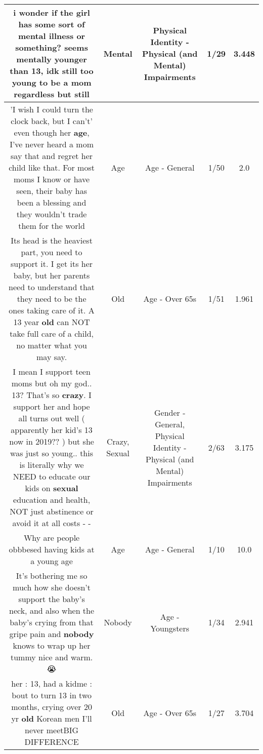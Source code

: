 \documentclass[11pt]{article}
\newlength\mylength
\begin{document}
\begin{center}
\begin{longtable}{|C{.65\mylength}|C{.30\mylength}|C{.12\mylength}|C{.12\mylength}|C{.12\mylength}|}
  \small i wonder if the girl has some sort of \textbf{mental} illness or something? seems mentally younger than 13, idk still too young to be a mom regardless but still\normalsize   & Mental & Physical Identity - Physical (and Mental) Impairments & 1/29 & 3.448 \\  \hline
  \small 'I wish I could turn the clock back, but I can't' even though her \textbf{age}, I've never heard a mom say that and regret her child like that. For most moms I know or have seen, their baby has been a blessing and they wouldn't trade them for the world\normalsize   & Age & Age - General & 1/50 & 2.0 \\  \hline
  \small Its head is the heaviest part, you need to support it. I get its her baby, but her parents need to understand that they need to be the ones taking care of it. A 13 year \textbf{old} can NOT take full care of a child, no matter what you may say.\normalsize   & Old & Age - Over 65s & 1/51 & 1.961 \\  \hline
  \small I mean I support teen moms but oh my god.. 13? That's so \textbf{crazy}. I support her and hope all turns out well ( apparently her kid's 13 now in 2019?? ) but she was just so young.. this is literally why we NEED to educate our kids on \textbf{sexual} education and health, NOT just abstinence or avoid it at all costs - -\normalsize   & Crazy, Sexual & Gender - General, Physical Identity - Physical (and Mental) Impairments & 2/63 & 3.175 \\  \hline
  \small Why are people obbbesed having kids at a young age\normalsize   & Age & Age - General & 1/10 & 10.0 \\  \hline
  \small It's bothering me so much how she doesn't support the baby's neck, and also when the baby's crying from that gripe pain and \textbf{nobody} knows to wrap up her tummy nice and warm. 😭\normalsize   & Nobody & Age - Youngsters & 1/34 & 2.941 \\  \hline
  \small her : 13,  had a kidme : bout to turn 13 in two months, crying over 20 yr \textbf{old} Korean men I'll never meetBIG DIFFERENCE\normalsize   & Old & Age - Over 65s & 1/27 & 3.704 \\  \hline

\end{longtable}
\end{center}
\end{document}
